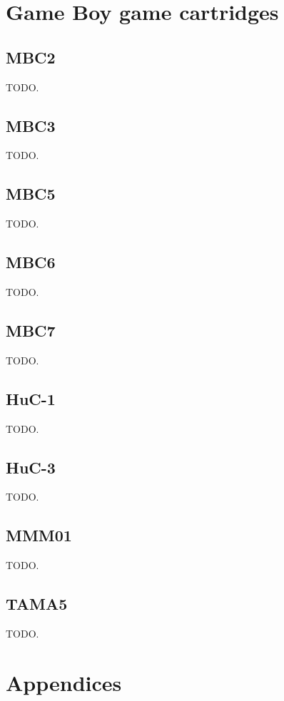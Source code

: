 \documentclass[a4paper, draft, oneside]{memoir}
\begin{document}
\part{Game Boy game cartridges}



\chapter{MBC2}

TODO.

\chapter{MBC3}

TODO.

\chapter{MBC5}

TODO.

\chapter{MBC6}

TODO.

\chapter{MBC7}

TODO.

\chapter{HuC-1}

TODO.

\chapter{HuC-3}

TODO.

\chapter{MMM01}

TODO.

\chapter{TAMA5}

TODO.

\part*{Appendices}

\begin{appendices}



\end{appendices}


\end{document}
